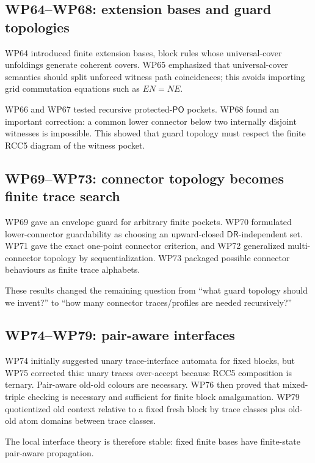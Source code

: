 \documentclass[11pt]{article}
\newcommand{\PO}{\mathsf{PO}}
\newcommand{\DR}{\mathsf{DR}}
\begin{document}
\subsection{WP64--WP68: extension bases and guard topologies}

WP64 introduced finite extension bases, block rules whose universal-cover unfoldings generate coherent covers.  WP65 emphasized that universal-cover semantics should split unforced witness path coincidences; this avoids importing grid commutation equations such as $EN=NE$.

WP66 and WP67 tested recursive protected-$\PO$ pockets.  WP68 found an important correction: a common lower connector below two internally disjoint witnesses is impossible.  This showed that guard topology must respect the finite RCC5 diagram of the witness pocket.

\subsection{WP69--WP73: connector topology becomes finite trace search}

WP69 gave an envelope guard for arbitrary finite pockets.  WP70 formulated lower-connector guardability as choosing an upward-closed $\DR$-independent set.  WP71 gave the exact one-point connector criterion, and WP72 generalized multi-connector topology by sequentialization.  WP73 packaged possible connector behaviours as finite trace alphabets.

These results changed the remaining question from ``what guard topology should we invent?'' to ``how many connector traces/profiles are needed recursively?''

\subsection{WP74--WP79: pair-aware interfaces}

WP74 initially suggested unary trace-interface automata for fixed blocks, but WP75 corrected this: unary traces over-accept because RCC5 composition is ternary.  Pair-aware old-old colours are necessary.  WP76 then proved that mixed-triple checking is necessary and sufficient for finite block amalgamation.  WP79 quotientized old context relative to a fixed fresh block by trace classes plus old-old atom domains between trace classes.

The local interface theory is therefore stable: fixed finite bases have finite-state pair-aware propagation.
\end{document}
